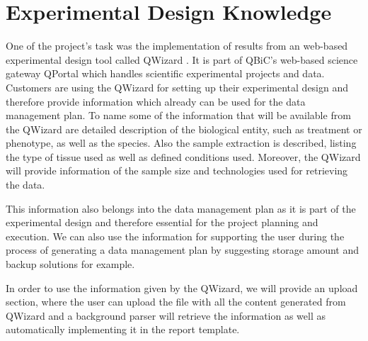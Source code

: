 \section{Experimental Design Knowledge}
One of the project's task was the implementation of results from an web-based experimental design tool called QWizard \cite{qwizard}. It is part of QBiC's web-based science gateway QPortal which handles scientific experimental projects and data. Customers are using the QWizard for setting up their experimental design and therefore provide information which already can be used for the data management plan. To name some of the information that will be available from the QWizard are detailed description of the biological entity, such as treatment or phenotype, as well as the species. Also the sample extraction is described, listing the type of tissue used as well as defined conditions used. Moreover, the QWizard will provide information of the sample size and technologies used for retrieving the data.

This information also belongs into the data management plan as it is part of the experimental design and therefore essential for the project planning and execution. We can also use the information for supporting the user during the process of generating a data management plan by suggesting storage amount and backup solutions for example.

In order to use the information given by the QWizard, we will provide an upload section, where the user can upload the file with all the content generated from QWizard and a background parser will retrieve the information as well as automatically implementing it in the report template.